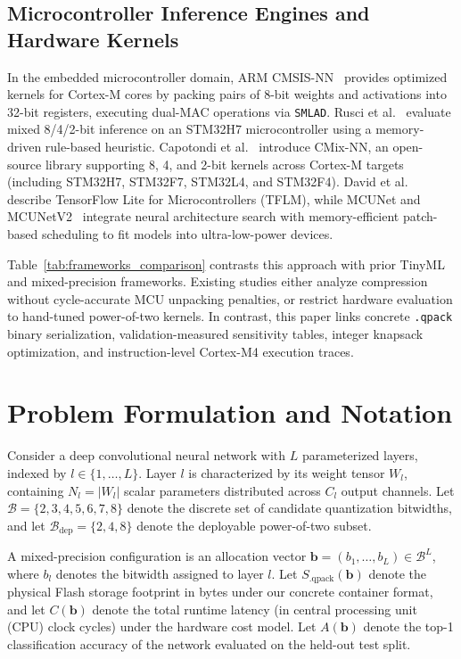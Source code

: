 \documentclass{ieeeaccess}
\begin{document}
\subsection{Microcontroller Inference Engines and Hardware Kernels}
In the embedded microcontroller domain, ARM CMSIS-NN~\cite{lai2018cmsisnn} provides optimized kernels for Cortex-M cores by packing pairs of 8-bit weights and activations into 32-bit registers, executing dual-MAC operations via \texttt{SMLAD}. Rusci et al.~\cite{rusci2020quantization} evaluate mixed 8/4/2-bit inference on an STM32H7 microcontroller using a memory-driven rule-based heuristic. Capotondi et al.~\cite{capotondi2020cmixnn} introduce CMix-NN, an open-source library supporting 8, 4, and 2-bit kernels across Cortex-M targets (including STM32H7, STM32F7, STM32L4, and STM32F4). David et al.~\cite{david2021tflm} describe TensorFlow Lite for Microcontrollers (TFLM), while MCUNet and MCUNetV2~\cite{lin2020mcunet, lin2021mcunetv2} integrate neural architecture search with memory-efficient patch-based scheduling to fit models into ultra-low-power devices.

Table~\ref{tab:frameworks_comparison} contrasts this approach with prior TinyML and mixed-precision frameworks. Existing studies either analyze compression without cycle-accurate MCU unpacking penalties, or restrict hardware evaluation to hand-tuned power-of-two kernels. In contrast, this paper links concrete \texttt{.qpack} binary serialization, validation-measured sensitivity tables, integer knapsack optimization, and instruction-level Cortex-M4 execution traces.



\section{Problem Formulation and Notation}
\label{sec:formulation}

Consider a deep convolutional neural network with $L$ parameterized layers, indexed by $l \in \{1, \dots, L\}$. Layer $l$ is characterized by its weight tensor $W_l$, containing $N_l = |W_l|$ scalar parameters distributed across $C_l$ output channels. Let $\mathcal{B} = \{2, 3, 4, 5, 6, 7, 8\}$ denote the discrete set of candidate quantization bitwidths, and let $\mathcal{B}_{\text{dep}} = \{2, 4, 8\}$ denote the deployable power-of-two subset.

A mixed-precision configuration is an allocation vector $\mathbf{b} = (b_1, \dots, b_L) \in \mathcal{B}^L$, where $b_l$ denotes the bitwidth assigned to layer $l$. Let $S_{\text{.qpack}}(\mathbf{b})$ denote the physical Flash storage footprint in bytes under our concrete container format, and let $C(\mathbf{b})$ denote the total runtime latency (in central processing unit (CPU) clock cycles) under the hardware cost model. Let $A(\mathbf{b})$ denote the top-1 classification accuracy of the network evaluated on the held-out test split.
\end{document}
